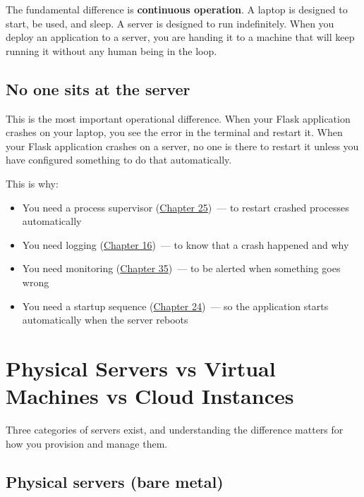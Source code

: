 The fundamental difference is \textbf{continuous operation}. A laptop is designed to start, be used, and sleep. A server is designed to run indefinitely. When you deploy an application to a server, you are handing it to a machine that will keep running it without any human being in the loop.

\subsection*{No one sits at the server}\label{20-server-fundamentals:no-one-sits-at-the-server}

This is the most important operational difference. When your Flask application crashes on your laptop, you see the error in the terminal and restart it. When your Flask application crashes on a server, no one is there to restart it unless you have configured something to do that automatically.

This is why:

\begin{itemize}
\tightlist
\item
  You need a process supervisor (\hyperref[ch:25-process-management]{Chapter 25})~--- to restart crashed processes automatically
\item
  You need logging (\hyperref[ch:16-logging-error-handling]{Chapter 16})~--- to know that a crash happened and why
\item
  You need monitoring (\hyperref[ch:35-observability]{Chapter 35})~--- to be alerted when something goes wrong
\item
  You need a startup sequence (\hyperref[ch:24-process-startup]{Chapter 24})~--- so the application starts automatically when the server reboots
\end{itemize}

\setcounter{section}{1}
\section{Physical Servers vs Virtual Machines vs Cloud Instances}\label{20-server-fundamentals:202-physical-servers-vs-virtual-machines-vs-cloud-instances}

Three categories of servers exist, and understanding the difference matters for how you provision and manage them.

\subsection*{Physical servers (bare metal)}\label{20-server-fundamentals:physical-servers-bare-metal}

